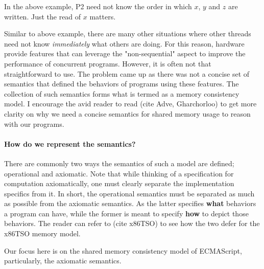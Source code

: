     In the above example, P2 need not know the order in which $x$, $y$ and $z$ are written. Just the read of $x$ matters. 
    
    Similar to above example, there are many other situations where other threads need not know \textit{immediately} what others are doing. For this reason,  hardware provide features that can leverage the "non-sequential" aspect to improve the performance of concurrent programs. However, it is often not that straightforward to use. The problem came up as there was not a concise set of semantics that defined the behaviors of programs using these features. The collection of such semantics forms what is termed as a memory consistency model. I encourage the avid reader to read (cite Adve, Gharchorloo) to get more clarity on why we need a concise semantics for shared memory usage to reason with our programs.
    
    
    \paragraph{How do we represent the semantics?}
    There are commonly two ways the semantics of such a model are defined; operational and axiomatic. Note that while thinking of a specification for computation axiomatically, one must clearly separate the implementation specifics from it. In short, the operational semantics must be separated as much as possible from the axiomatic semantics. As the latter specifies \textbf{what} behaviors a program can have, while the former is meant to specify \textbf{how} to depict those behaviors. The reader can refer to (cite x86TSO) to see how the two defer for the x86TSO memory model.
    
    Our focus here is on the shared memory consistency model of ECMAScript, particularly, the axiomatic semantics.
    
    

    

    